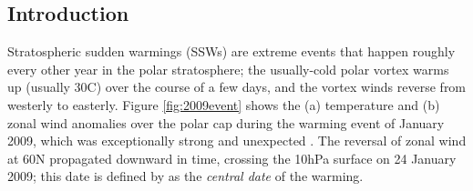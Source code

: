 \documentclass[draft,jgrga]{agutex}
\begin{document}
%
%

%

\begin{article}

%
%

\section{Introduction}


Stratospheric sudden warmings (SSWs) are extreme events that happen roughly every other year in the polar stratosphere; the usually-cold polar vortex warms up (usually 30\degree C) over the course of a few days, and the vortex winds reverse from westerly to easterly.
Figure \ref{fig:2009event} shows the (a) temperature and (b) zonal wind anomalies over the polar cap during the warming event of January 2009, which was exceptionally strong and unexpected \citep{haradaetal2010, ayarzaguenaetal2011}.
The reversal of zonal wind at 60\degree N propagated downward in time, crossing the 10hPa surface on 24 January 2009; this date is defined by \cite{Charlton2007} as the \textit{central date} of the warming.  


\end{article}
\end{document}
